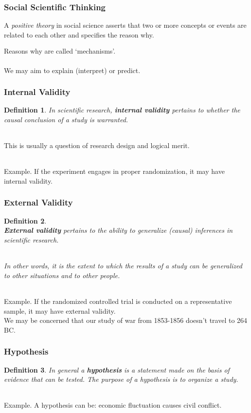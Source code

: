 \documentclass[aspectratio=169]{beamer}
\newtheorem{defn}{Definition}
\numberwithin{equation}{section}
\begin{document}
\begin{frame}
\frametitle{Social Scientific Thinking}
A \emph{positive theory} in social science asserts that two or more concepts or events are related to each other and specifies the reason why.  

Reasons why are called `mechanisms'.\\

\ \\We may aim to explain (interpret) or predict. 
\end{frame}



\begin{frame}
\frametitle{Internal Validity}

\begin{defn}
In scientific research, \textbf{internal validity} pertains to whether the causal conclusion of a study is warranted.  
\end{defn} \pause

\ \\This is usually a question of research design and logical merit.

\ \\Example. If the experiment engages in proper randomization, it may have internal validity. 
\end{frame}



\begin{frame}
\frametitle{External Validity}

\begin{defn}
\  \\\textbf{External validity} pertains to the ability to generalize (causal) inferences in scientific research.


\ \\ In other words, it is the extent to which the results of a study can be generalized to other situations and to other people.
\end{defn} \pause

\ \\Example. If the randomized controlled trial is conducted on a representative sample, it may have external validity.\\ We may be concerned that our study of war from 1853-1856 doesn't travel to 264 BC.

\end{frame}



\begin{frame}
\frametitle{Hypothesis}

\begin{defn}
In general a \textbf{hypothesis} is a statement made on the basis of evidence that can be tested. The purpose of a hypothesis is to organize a study.
\end{defn} \pause

\ \\Example. A hypothesis can be: economic fluctuation causes civil conflict. 

\end{frame}
\end{document}
